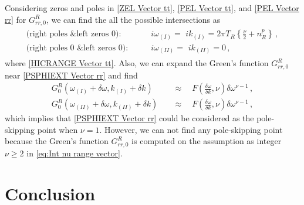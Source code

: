 \documentclass[11pt,a4paper]{article}
\begin{document}
Considering zeros and poles in \eqref{ZEL Vector tt}, \eqref{PEL Vector tt}, and \eqref{PEL Vector rr} for $G^R_{rr,0}$, we can find the all the possible intersections as
\begin{align}\label{PSPHIEXT Vector rr}
\begin{split}
\text{(right poles \& left zeros 0):} \qquad
& i \omega_{(I)} = \,\, i k_{(I)} = 2 \pi T_R \left\{ \frac{\nu}{2} + n^p_R \right\}\,,
\\
\text{(right poles 0 \& left zeros 0):} \qquad
& i \omega_{(II)} = \,\, i k_{(II)} = 0\,,
\end{split}
\end{align}
where \eqref{HICRANGE Vector tt}.
Also, we can expand the Green's function $G^R_{rr,0}$ near \eqref{PSPHIEXT Vector rr} and find
\begin{align}
G^R_0(\omega_{(I)} + \delta \omega, k_{(I)} + \delta k)  &\quad\approx\quad F
\left(\frac{\delta \omega}{\delta k}, \nu\right)
\delta \omega^{\nu-1}  \,,\\
G^R_0(\omega_{(II)} + \delta \omega, k_{(II)} + \delta k)  &\quad\approx\quad F
\left(\frac{\delta \omega}{\delta k}, \nu\right)
\delta \omega^{\nu-1}  \,,
\end{align}
which implies that \eqref{PSPHIEXT Vector rr} could be considered as the pole-skipping point when $\nu=1$.
However, we can not find any pole-skipping point because the Green's function $G^R_{rr,0}$ is computed on the assumption as integer $\nu\geq2$ in \eqref{eq:Int nu range vector}.






%    
\section{Conclusion}\label{sec:Conclusions}
\end{document}
